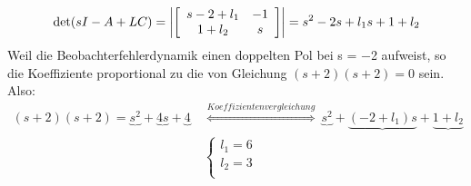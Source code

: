 \begin{equation}
    \mathop{}\!\mathrm{det}(sI-A+LC)=\left|\left[\begin{array}{cc}
            s-2+l_1 & -1 \\
            1+l_2   & s  \\
        \end{array}\right]\right|=s^2-2s+l_1s+1+l_2
\end{equation}
Weil die Beobachterfehlerdynamik einen doppelten Pol bei s = −2 aufweist, so die Koeffiziente proportional zu die von Gleichung $(s+2)(s+2)=0$ sein. Also:
\begin{equation}
    \begin{aligned}
        (s+2)(s+2)=\underbrace{s^2}+\underbrace{4s}+\underbrace{4}\  & \overset{Koeffizientenvergleichung}{\Longleftrightarrow}\ \underbrace{s^2}+\underbrace{(-2+l_1)s}+\underbrace{1+l_2} \\
                                                                     & \left\{\begin{array}{c}
            l_1=6 \\
            l_2=3 \\
        \end{array}\right.                                                                             \\
    \end{aligned}
\end{equation}